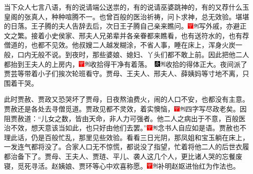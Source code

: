 当下众人七言八语，有的说请端公送祟的，有的说请巫婆跳神的，有的又荐什么玉皇阁的张真人，种种喧腾不一。也曾百般的医治祈祷，问卜求神，总无效验。堪堪的日落。王子腾的夫人告辞去后，次日王子腾自己亲来瞧问。{\includegraphics[width=3mm]{../Images/00002}\includegraphics[width=3mm]{../Images/00011}\footnotesize \kaishu 写外戚，亦避正文之繁。}接着小史侯家、邢夫人兄弟辈并各亲眷都来瞧看，也有送符水的，也有荐僧道的，也都不见效。他叔嫂二人越发糊涂，不省人事，睡在床上，浑身火炭一般，口内无般不说。到夜时，那些婆娘、媳妇、丫头们都不敢上前。因此把他二人都抬到王夫人的上房内，{\includegraphics[width=3mm]{../Images/00002}\includegraphics[width=3mm]{../Images/00011}\footnotesize \kaishu 收拾得干净有着落。　\includegraphics[width=3mm]{../Images/00004}\includegraphics[width=3mm]{../Images/00011}\footnotesize \kaishu 收拾的得体正大。}夜间派了贾芸等带着小子们挨次轮班看守。贾母、王夫人、邢夫人、薛姨妈等寸地不离，只围着干哭。

此时贾赦、贾政又恐哭坏了贾母，日夜熬油费火，闹的人口不安，也都没有主意。贾赦还是各处去寻僧觅道。贾政见都不灵效，着实懊恼，{\includegraphics[width=3mm]{../Images/00002}\includegraphics[width=3mm]{../Images/00011}\footnotesize \kaishu 四字写尽政老矣。}因阻贾赦道：``儿女之数，皆由天命，非人力可强者。他二人之病出于不意，百般医治不效，想天意该当如此，也只好由他们去罢。''{\includegraphics[width=3mm]{../Images/00002}\includegraphics[width=3mm]{../Images/00011}\footnotesize \kaishu 念书人自应如是语。}贾赦也不理此话，仍是百般忙乱，那里见些效验。看看三日光阴，那凤姐和宝玉躺在床上，一发连气都将没了。合家人口无不惊慌，都说没了指望，忙着将他二人的后世衣履都治备下了。贾母、王夫人、贾琏、平儿、袭人这几个人，更比诸人哭的忘餐废寝，觅死寻活。赵姨娘、贾环等心中欢喜称愿。{\includegraphics[width=3mm]{../Images/00002}\includegraphics[width=3mm]{../Images/00011}\footnotesize \kaishu 补明赵妪进怡红为作法也。}


